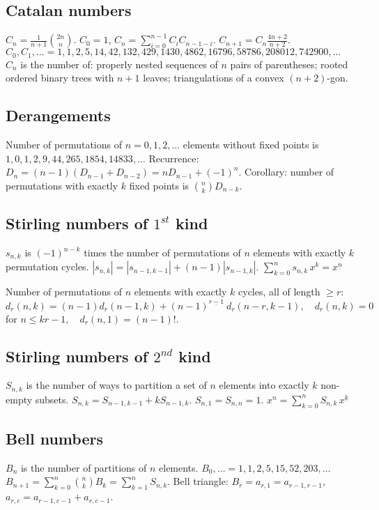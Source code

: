 \documentclass[12pt]{extarticle}
\begin{document}
\begin{multicols*}{2}
\subsection{Catalan numbers}
$C_n = \frac{1}{n+1} {2n \choose n}$.
\quad $C_0=1$, $C_n=\sum_{i=0}^{n-1} C_i C_{n-1-i}$.
\quad $C_{n+1} = C_n \frac{4n+2}{n+2}$. \\
$C_0, C_1, \ldots = 1, 1, 2, 5, 14, 42, 132, 429, 1430, 4862, 16796,
		58786, 208012, 742900, \ldots$ \\
$C_n$ is the number of:
properly nested sequences of $n$ pairs of parentheses;
rooted ordered binary trees with $n+1$ leaves;
triangulations of a convex $(n+2)$-gon.

\subsection{Derangements}
Number of permutations of $n=0,1,2,\dots$ elements without fixed points is
$1, 0, 1, 2, 9, 44, 265, 1854, 14833, \dots$
Recurrence: $D_n = (n-1)(D_{n-1} + D_{n-2}) = n D_{n-1} + (-1)^n$.
Corollary: number of permutations with exactly $k$ fixed points is ${n \choose k} D_{n-k}$.

\subsection{Stirling numbers of $1^{st}$ kind}
$s_{n,k}$ is $(-1)^{n-k}$ times the number of permutations of $n$ elements with
exactly $k$ permutation cycles.
$|s_{n,k}| = |s_{n-1,k-1}| + (n-1) |s_{n-1,k}|$. \quad
$\sum_{k=0}^n s_{n,k}\,x^k = x^{\underline n}$

Number of permutations of $n$ elements with exactly $k$ cycles,
all of length $\ge r$: \\
$d_r(n,k) = (n-1) d_r(n-1,k) + (n-1)^{\underline {r-1}}\ d_r(n-r,k-1),
\quad d_r(n,k)=0 $ for $ n\le kr-1, \quad d_r(n,1)=(n-1)!$.

\subsection{Stirling numbers of $2^{nd}$ kind}
$S_{n,k}$ is the number of ways to partition a set of $n$ elements into
exactly $k$ non-empty subsets.
$S_{n,k} = S_{n-1,k-1} + k S_{n-1,k}$.
$S_{n,1} = S_{n,n} = 1$.
$x^n = \sum_{k=0}^n S_{n,k}\,x^{\underline k}$

\subsection{Bell numbers}
$B_n$ is the number of partitions of $n$ elements.
$B_0, \ldots = 1,1,2,5,15,52,203,\ldots$ \\
$B_{n+1} = \sum_{k=0}^n {n \choose k} B_k = \sum_{k=1}^n S_{n,k}$.
Bell triangle: $B_r=a_{r,1}=a_{r-1,r-1}$, $a_{r,c}=a_{r-1,c-1}+a_{r,c-1}$.


\end{multicols*}
\end{document}
